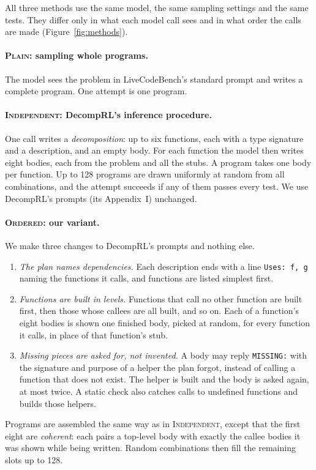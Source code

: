 \documentclass[11pt]{article}
\newcommand{\plain}{\textsc{Plain}}
\newcommand{\indep}{\textsc{Independent}}
\newcommand{\ordered}{\textsc{Ordered}}
\begin{document}
All three methods use the same model, the same sampling settings and the same tests. They differ only in what each
model call sees and in what order the calls are made (Figure~\ref{fig:methods}).

\paragraph{\plain: sampling whole programs.} The model sees the problem in LiveCodeBench's standard prompt and writes
a complete program. One attempt is one program.

\paragraph{\indep: DecompRL's inference procedure.} One call writes a \emph{decomposition}: up to six functions, each
with a type signature and a description, and an empty body. For each function the model then writes eight bodies, each
from the problem and all the stubs. A program takes one body per function. Up to 128 programs are drawn uniformly at
random from all combinations, and the attempt succeeds if any of them passes every test. We use DecompRL's prompts
(its Appendix~I) unchanged.

\paragraph{\ordered: our variant.} We make three changes to DecompRL's prompts and nothing else.
\begin{enumerate}[label=(\roman*)]
  \item \emph{The plan names dependencies.} Each description ends with a line \texttt{Uses: f, g} naming the functions
        it calls, and functions are listed simplest first.
  \item \emph{Functions are built in levels.} Functions that call no other function are built first, then those whose
        callees are all built, and so on. Each of a function's eight bodies is shown one finished body, picked at
        random, for every function it calls, in place of that function's stub.
  \item \emph{Missing pieces are asked for, not invented.} A body may reply \texttt{MISSING:} with the signature and
        purpose of a helper the plan forgot, instead of calling a function that does not exist. The helper is built
        and the body is asked again, at most twice. A static check also catches calls to undefined functions and
        builds those helpers.
\end{enumerate}
Programs are assembled the same way as in \indep, except that the first eight are \emph{coherent}: each pairs a
top-level body with exactly the callee bodies it was shown while being written. Random combinations then fill the
remaining slots up to 128.
\end{document}
